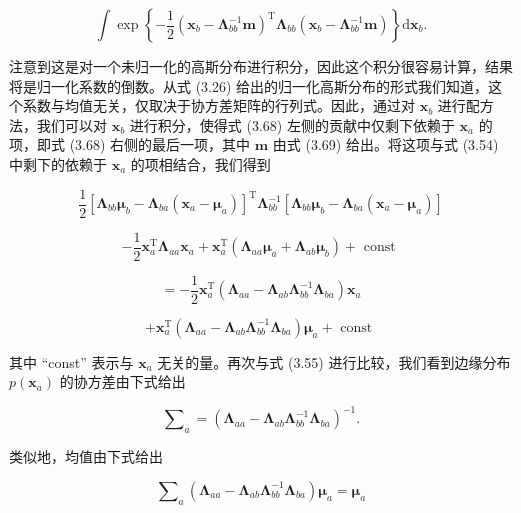 \documentclass[10pt]{article}
\begin{document}
\[
\int \exp \left\{  {-\frac{1}{2}{\left( {\mathbf{x}}_{b} - {\mathbf{\Lambda }}_{bb}^{-1}\mathbf{m}\right) }^{\mathrm{T}}{\mathbf{\Lambda }}_{bb}\left( {{\mathbf{x}}_{b} - {\mathbf{\Lambda }}_{bb}^{-1}\mathbf{m}}\right) }\right\}  \mathrm{d}{\mathbf{x}}_{b}. \tag{3.70}
\]

注意到这是对一个未归一化的高斯分布进行积分，因此这个积分很容易计算，结果将是归一化系数的倒数。从式 (3.26) 给出的归一化高斯分布的形式我们知道，这个系数与均值无关，仅取决于协方差矩阵的行列式。因此，通过对 \({\mathbf{x}}_{b}\) 进行配方法，我们可以对 \({\mathbf{x}}_{b}\) 进行积分，使得式 (3.68) 左侧的贡献中仅剩下依赖于 \({\mathbf{x}}_{a}\) 的项，即式 (3.68) 右侧的最后一项，其中 \(\mathbf{m}\) 由式 (3.69) 给出。将这项与式 (3.54) 中剩下的依赖于 \({\mathbf{x}}_{a}\) 的项相结合，我们得到

\[
\frac{1}{2}{\left\lbrack  {\mathbf{\Lambda }}_{bb}{\mathbf{\mu }}_{b} - {\mathbf{\Lambda }}_{ba}\left( {\mathbf{x}}_{a} - {\mathbf{\mu }}_{a}\right) \right\rbrack  }^{\mathrm{T}}{\mathbf{\Lambda }}_{bb}^{-1}\left\lbrack  {{\mathbf{\Lambda }}_{bb}{\mathbf{\mu }}_{b} - {\mathbf{\Lambda }}_{ba}\left( {{\mathbf{x}}_{a} - {\mathbf{\mu }}_{a}}\right) }\right\rbrack
\]

\[
- \frac{1}{2}{\mathbf{x}}_{a}^{\mathrm{T}}{\mathbf{\Lambda }}_{aa}{\mathbf{x}}_{a} + {\mathbf{x}}_{a}^{\mathrm{T}}\left( {{\mathbf{\Lambda }}_{aa}{\mathbf{\mu }}_{a} + {\mathbf{\Lambda }}_{ab}{\mathbf{\mu }}_{b}}\right)  + \text{ const }
\]

\[
=  - \frac{1}{2}{\mathbf{x}}_{a}^{\mathrm{T}}\left( {{\mathbf{\Lambda }}_{aa} - {\mathbf{\Lambda }}_{ab}{\mathbf{\Lambda }}_{bb}^{-1}{\mathbf{\Lambda }}_{ba}}\right) {\mathbf{x}}_{a}
\]

\[
+ {\mathbf{x}}_{a}^{\mathrm{T}}\left( {{\mathbf{\Lambda }}_{aa} - {\mathbf{\Lambda }}_{ab}{\mathbf{\Lambda }}_{bb}^{-1}{\mathbf{\Lambda }}_{ba}}\right) {\mathbf{\mu }}_{a} + \text{ const } \tag{3.71}
\]

其中 “const” 表示与 \({\mathbf{x}}_{a}\) 无关的量。再次与式 (3.55) 进行比较，我们看到边缘分布 \(p\left( {\mathbf{x}}_{a}\right)\) 的协方差由下式给出

\[
{\mathbf{\sum }}_{a} = {\left( {\mathbf{\Lambda }}_{aa} - {\mathbf{\Lambda }}_{ab}{\mathbf{\Lambda }}_{bb}^{-1}{\mathbf{\Lambda }}_{ba}\right) }^{-1}. \tag{3.72}
\]

类似地，均值由下式给出

\[
{\mathbf{\sum }}_{a}\left( {{\mathbf{\Lambda }}_{aa} - {\mathbf{\Lambda }}_{ab}{\mathbf{\Lambda }}_{bb}^{-1}{\mathbf{\Lambda }}_{ba}}\right) {\mathbf{\mu }}_{a} = {\mathbf{\mu }}_{a} \tag{3.73}
\]
\end{document}
